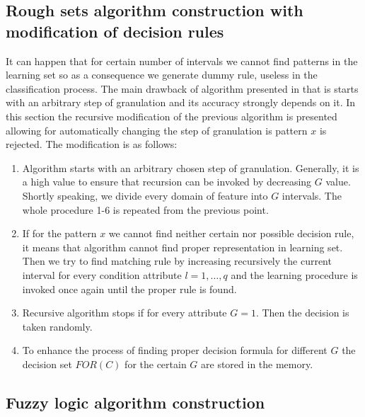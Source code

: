 \subsection{Rough sets algorithm construction with modification of decision rules}
\label{cha:Algorithm_construction_rough_set_modification}
It can happen that for certain number of intervals we cannot find patterns in
the learning set so as a consequence we generate dummy rule, useless in the
classification process. The main drawback of algorithm presented in \label{cha:Algorithm_construction_rough_set}
that is starts with an arbitrary step of granulation and its accuracy strongly
depends on it. In this section the recursive modification of the previous algorithm is
presented allowing for automatically changing the step of granulation is
pattern $x$ is rejected. The modification is as follows:
\begin{enumerate}
    \item Algorithm starts with an arbitrary chosen step of granulation.
        Generally, it is a high value to ensure that recursion can be invoked
        by decreasing $G$ value. Shortly speaking, we divide every domain of feature into $G$
        intervals. The whole procedure 1-6 is repeated from the previous point.
    \item If for the pattern $x$ we cannot find neither certain nor possible
        decision rule, it means that algorithm cannot find proper representation 
        in learning set. Then we try to find matching rule by increasing recursively
        the current interval for every condition attribute $l=1, \ldots, q$ and
        the learning procedure is invoked once again until the proper rule is
        found.  
    \item Recursive algorithm stops if for every attribute $G=1$. Then the
        decision is taken randomly.
    \item To enhance the process of finding proper decision formula for
        different $G$ the decision set $FOR(C)$ for the certain $G$ are stored
        in the memory.
\end{enumerate}

\subsection{Fuzzy logic algorithm construction}
\label{cha:Algorithm_construction_fuzzy_logic}
